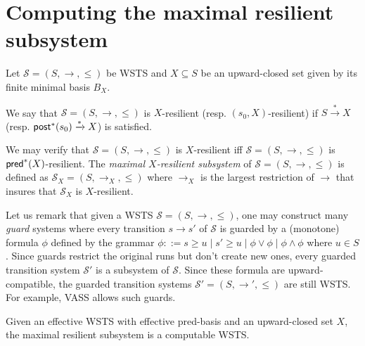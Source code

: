 \section{Computing the maximal resilient subsystem}

Let $\mathscr{S}=(S, \rightarrow, \leq)$ be WSTS and $X \subseteq S$ be an upward-closed set given by its finite minimal basis $B_X$. 

\begin{definition}
We say that $\mathscr{S}=(S, \rightarrow, \leq)$ is $X$-resilient (resp. $(s_0,X)$-resilient) if $S  \xrightarrow{*} X$ (resp. $\textsf{post}^*(s_0) \xrightarrow{*} X$) is satisfied.  
\end{definition}

We may verify that  $\mathscr{S}=(S, \rightarrow, \leq)$ is $X$-resilient iff  $\mathscr{S}=(S, \rightarrow, \leq)$ is $\textsf{pred}^*(X)$-resilient. The \emph{maximal $X$-resilient subsystem} of $\mathscr{S}=(S,\rightarrow,\leq)$ is defined as $\mathscr{S}_X=(S,\rightarrow_X,\leq)$ where $\rightarrow_X$ is the largest restriction of $\rightarrow$ that insures that $\mathscr{S}_X$ is $X$-resilient.

Let us remark that given a WSTS $\mathscr{S}=(S, \rightarrow, \leq)$, one may construct many \emph{guard} systems where every transition $s \rightarrow s'$ of $\mathscr{S}$ is guarded by a (monotone) formula $\phi$ defined by the grammar $\phi ::= s \geq u \mid s' \geq u \mid \phi \vee \phi \mid \phi \wedge \phi$ where $u \in S$. Since guards restrict the original runs but don't create new ones, every guarded transition system $\mathscr{S'}$ is a subsystem of $\mathscr{S}$. Since these formula are upward-compatible, the guarded transition systems $\mathscr{S'}=(S, \rightarrow', \leq)$ are still WSTS.
%
For example, VASS allows such guards.

\begin{theorem}{}
Given an effective WSTS with effective pred-basis and an upward-closed set $X$, the maximal resilient subsystem is a computable WSTS.
\end{theorem}

